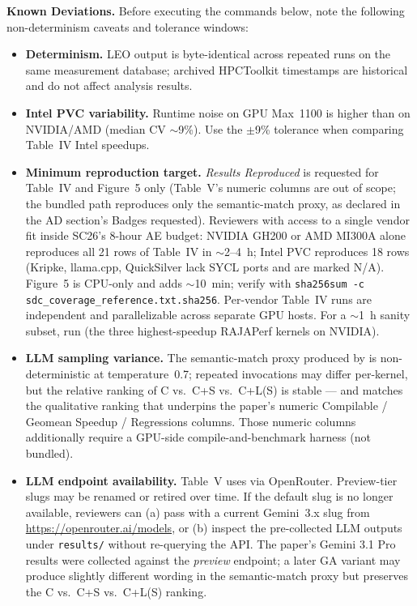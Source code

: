 \documentclass[conference]{IEEEtran}
\begin{document}
\textbf{Known Deviations.} Before executing the commands below, note the following non-determinism caveats and tolerance windows:
\begin{itemize}
\item \textbf{Determinism.} LEO output is byte-identical across repeated runs on the same measurement database; archived HPCToolkit timestamps are historical and do not affect analysis results.
\item \textbf{Intel PVC variability.} Runtime noise on GPU Max~1100 is higher than on NVIDIA/AMD (median CV $\sim$9\%). Use the $\pm$9\% tolerance when comparing Table~IV Intel speedups.
\item \textbf{Minimum reproduction target.} \emph{Results Reproduced} is requested for Table~IV and Figure~5 only (Table~V's numeric columns are out of scope; the bundled  path reproduces only the semantic-match proxy, as declared in the AD section's Badges requested). Reviewers with access to a single vendor fit inside SC26's 8-hour AE budget: NVIDIA GH200 or AMD MI300A alone reproduces all 21 rows of Table~IV in $\sim$2--4~h; Intel PVC reproduces 18 rows (Kripke, llama.cpp, QuickSilver lack SYCL ports and are marked N/A). Figure~5 is CPU-only and adds $\sim$10~min; verify with \texttt{sha256sum -c sdc\_coverage\_reference.txt.sha256}. Per-vendor Table~IV runs are independent and parallelizable across separate GPU hosts. For a $\sim$1~h sanity subset, run  (the three highest-speedup RAJAPerf kernels on NVIDIA).
\item \textbf{LLM sampling variance.} The semantic-match proxy produced by  is non-deterministic at temperature~0.7; repeated invocations may differ per-kernel, but the relative ranking of C vs.\ C+S vs.\ C+L(S) is stable --- and matches the qualitative ranking that underpins the paper's numeric Compilable / Geomean Speedup / Regressions columns. Those numeric columns additionally require a GPU-side compile-and-benchmark harness (not bundled).
\item \textbf{LLM endpoint availability.} Table~V uses  via OpenRouter. Preview-tier slugs may be renamed or retired over time. If the default slug is no longer available, reviewers can (a) pass  with a current Gemini~3.x slug from \url{https://openrouter.ai/models}, or (b) inspect the pre-collected LLM outputs under \texttt{results/} without re-querying the API. The paper's Gemini 3.1 Pro results were collected against the \emph{preview} endpoint; a later GA variant may produce slightly different wording in the semantic-match proxy but preserves the C vs.\ C+S vs.\ C+L(S) ranking.
\end{itemize}
\end{document}
